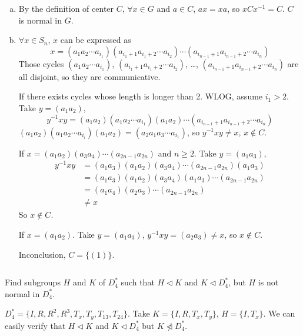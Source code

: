 \begin{answer}
    \begin{enumerate}[(a)]
        \item By the definition of center $C$, $\forall x\in G$ and $a\in C$, $ax=xa$, so $xCx^{-1}=C$. $C$ is normal in $G$.
        \item $\forall x\in S_{n}$, $x$ can be expressed as \[x=(a_{1}a_{2}\cdots a_{i_{1}})(a_{i_{1}+1}a_{i_{1}+2}\cdots a_{i_{2}})\cdots(a_{i_{n-1}+1}a_{i_{n-1}+2}\cdots a_{i_{n}})\]
        Those cycles $(a_{1}a_{2}\cdots a_{i_{1}})$, $(a_{i_{1}+1}a_{i_{1}+2}\cdots a_{i_{2}})$, \dots, $(a_{i_{n-1}+1}a_{i_{n-1}+2}\cdots a_{i_{n}})$ are all disjoint, so they are communicative.

        If there exists cycles whose length is longer than 2. WLOG, assume $i_{1}>2$. Take $y=(a_{1}a_{2})$, \[y^{-1}xy=(a_{1}a_{2})(a_{1}a_{2}\cdots a_{i_{1}})(a_{1}a_{2})\cdots(a_{i_{n-1}+1}a_{i_{n-1}+2}\cdots a_{i_{n}})\] $(a_{1}a_{2})(a_{1}a_{2}\cdots a_{i_{i}})(a_{1}a_{2})=(a_{2}a_{1}a_{3}\cdots a_{i_{1}})$, so $y^{-1}xy\neq x$, $x\notin C$. 

        If $x=(a_{1}a_{2})(a_{3}a_{4})\cdots(a_{2n-1}a_{2n})$ and $n\geq 2$. Take $y=(a_{1}a_{3})$, \[\begin{aligned}
            y^{-1}xy&=(a_{1}a_{3})(a_{1}a_{2})(a_{3}a_{4})\cdots(a_{2n-1}a_{2n})(a_{1}a_{3})\\&=(a_{1}a_{3})(a_{1}a_{2})(a_{3}a_{4})(a_{1}a_{3})\cdots(a_{2n-1}a_{2n})\\&=(a_{1}a_{4})(a_{2}a_{3})\cdots(a_{2n-1}a_{2n})\\&\neq x
        \end{aligned}\] So $x\notin C$.

        If $x=(a_{1}a_{2})$. Take $y=(a_{1}a_{3})$, $y^{-1}xy=(a_{2}a_{3})\neq x$, so $x\notin C$.

        Inconclusion, $C=\{(1)\}$.
    \end{enumerate}
\end{answer}

$$ $$

\begin{ex}
    Find subgroups $H$ and $K$ of $D_{4}^{*}$ such that $H\lhd K$ and $K\lhd D_{4}^{*}$, but $H$ is not normal in $D_{4}^{*}$.
\end{ex}

\begin{answer}
    $D_{4}^{*}=\{I,R,R^{2},R^{3},T_{x},T_{y},T_{13},T_{24}\}$. Take $K=\{I, R, T_{x}, T_{y}\}$, $H=\{I, T_{x}\}$. We can easily verify that $H\lhd K$ and $K\lhd  D_{4}^{*}$ but $K\ntriangleleft  D_{4}^{*}$.
\end{answer}

